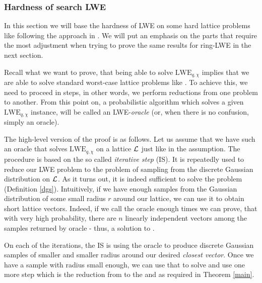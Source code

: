 \subsubsection{Hardness of search LWE}
In this section we will base the hardness of LWE on some hard lattice problems like  following the approach in \cite{regev}. We will put an emphasis on the parts that require the most adjustment when trying to prove the same results for ring-LWE in the next section.

Recall what we want to prove, that being able to solve $\text{LWE}_{q, \chi}$ implies that we are able to solve standard worst-case lattice problems like . To achieve this, we need to proceed in steps, in other words, we perform reductions from one problem to another. From this point on, a probabilistic algorithm which solves a given $\text{LWE}_{q, \chi}$ instance, will be called an LWE-\textit{oracle} (or, when there is no confusion, simply an oracle).

The high-level version of the proof is as follows. Let us assume that we have such an oracle that solves $\text{LWE}_{q, \chi}$ on a lattice $\mathcal{L}$ just like in the assumption. The procedure is based on the so called \textit{iterative step} (IS). It is repeatedly used to reduce our LWE problem to the problem of sampling from the  discrete Gaussian distribution on $\mathcal{L}$. As it turns out, it is indeed sufficient to solve the  problem (Definition \ref{dgs}). Intuitively, if we have enough samples from the Gaussian distribution of some small radius $r$ around our lattice, we can use it to obtain short lattice vectors. Indeed, if we call the  oracle enough times we can prove, that with very high probability, there are $n$ linearly independent vectors among the samples returned by oracle - thus, a solution to .

On each of the iterations, the IS is using the oracle to produce discrete Gaussian samples of smaller and smaller radius around our desired \textit{closest vector}. Once we have a sample with radius small enough, we can use that to solve  and use one more step which is the reduction from  to the  and  as required in Theorem \ref{main}.

\begin{center}
\end{center}

